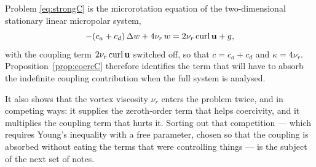 \documentclass[11pt,a4paper]{article}
\begin{document}
Problem \eqref{eq:strongC} is the microrotation equation of the two-dimensional
stationary linear micropolar system,
\[
  -(c_a+c_d)\,\Delta w + 4\nu_r\,w = 2\nu_r \operatorname{curl} \mathbf{u} + g ,
\]
with the coupling term $2\nu_r \operatorname{curl} \mathbf{u}$ switched off, so that $c = c_a+c_d$ and
$\kappa = 4\nu_r$. Proposition~\ref{prop:coercC} therefore identifies the term
that will have to absorb the indefinite coupling contribution when the full
system is analysed.

It also shows that the vortex viscosity $\nu_r$ enters the problem twice, and in
competing ways: it supplies the zeroth-order term that helps coercivity, and it
multiplies the coupling term that hurts it. Sorting out that competition ---
which requires Young's inequality with a free parameter, chosen so that the
coupling is absorbed without eating the terms that were controlling things ---
is the subject of the next set of notes.
\end{document}
